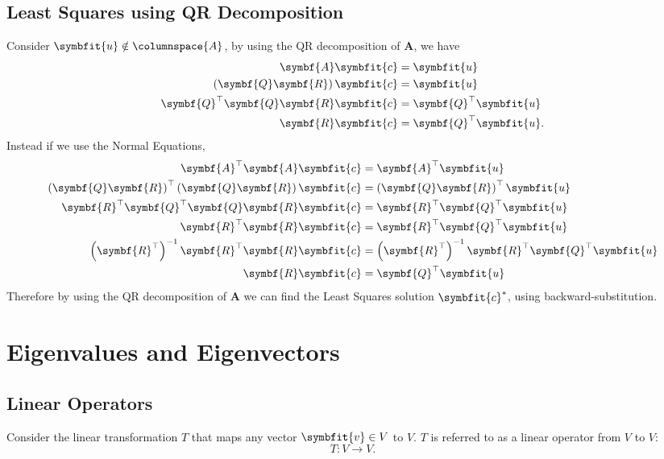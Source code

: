 \documentclass{article}
\begin{document}
\subsection{Least Squares using QR Decomposition}
Consider \(\symbfit{u} \notin \columnspace{A}\), by using the QR decomposition of \(\symbf{A}\), we have
\begin{align*}
    \symbf{A} \symbfit{c}                          & = \symbfit{u}                 \\
    \left( \symbf{Q} \symbf{R} \right) \symbfit{c} & = \symbfit{u}                 \\
    \symbf{Q}^\top \symbf{Q} \symbf{R} \symbfit{c} & = \symbf{Q}^\top \symbfit{u}  \\
    \symbf{R} \symbfit{c}                          & = \symbf{Q}^\top \symbfit{u}.
\end{align*}
Instead if we use the Normal Equations,
\begin{align*}
    \symbf{A}^\top \symbf{A} \symbfit{c}                                                   & = \symbf{A}^\top \symbfit{u}                                                   \\
    \left( \symbf{Q} \symbf{R} \right)^\top \left( \symbf{Q} \symbf{R} \right) \symbfit{c} & = \left( \symbf{Q} \symbf{R} \right)^\top \symbfit{u}                          \\
    \symbf{R}^\top \symbf{Q}^\top \symbf{Q} \symbf{R} \symbfit{c}                          & = \symbf{R}^\top \symbf{Q}^\top \symbfit{u}                                    \\
    \symbf{R}^\top \symbf{R} \symbfit{c}                                                   & = \symbf{R}^\top \symbf{Q}^\top \symbfit{u}                                    \\
    \left( \symbf{R}^\top \right)^{-1} \symbf{R}^\top \symbf{R} \symbfit{c}                & = \left( \symbf{R}^\top \right)^{-1} \symbf{R}^\top \symbf{Q}^\top \symbfit{u} \\
    \symbf{R} \symbfit{c}                                                                  & = \symbf{Q}^\top \symbfit{u}
\end{align*}
Therefore by using the QR decomposition of \(\symbf{A}\) we can find the Least Squares solution \(\symbfit{c}^\ast\), using backward-substitution.
\section{Eigenvalues and Eigenvectors}
\subsection{Linear Operators}
Consider the linear transformation \(T\) that maps any vector
\(\symbfit{v}\in V\) to \(V\). \(T\) is referred to as a linear operator from \(V\) to \(V\):
\begin{equation*}
    T:V \to V.
\end{equation*}
\end{document}
